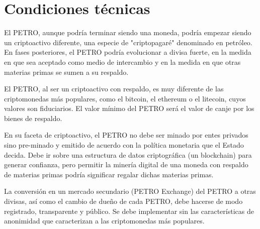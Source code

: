 %
\section{Condiciones técnicas}
\label{sec:annexa}
%
El PETRO, aunque podría terminar siendo una moneda, podría empezar siendo un criptoactivo diferente, una especie de "criptopagaré" denominado en petróleo. En fases posteriores, el PETRO podría evolucionar a divisa fuerte, en la medida en que sea aceptado como medio de intercambio y en la medida en que otras materias primas se sumen a su respaldo.

El PETRO, al ser un criptoactivo con respaldo, es muy diferente de las criptomonedas más populares, como el bitcoin, el ethereum o el litecoin, cuyos valores son fiduciarios. El valor mínimo del PETRO será el valor de canje por los bienes de respaldo. 

En su faceta de criptoactivo, el PETRO no debe ser minado por entes privados sino pre-minado y emitido de acuerdo con la política monetaria que el Estado decida. Debe ir sobre una estructura de datos criptográfica (un blockchain) para generar confianza, pero permitir la minería digital de una moneda con respaldo de materias primas podría significar regalar dichas materias primas. 

La conversión en un mercado secundario (PETRO Exchange) del PETRO a otras divisas, así como el cambio de dueño de cada PETRO, debe hacerse de modo registrado, transparente y público. Se debe implementar sin las características de anonimidad que caracterizan a las criptomonedas más populares.


